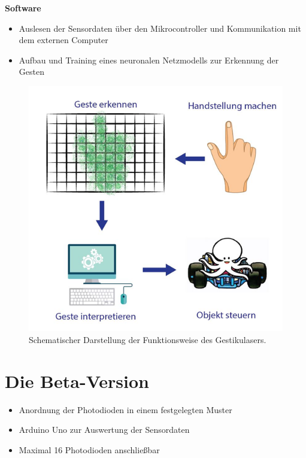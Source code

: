 \documentclass{sciposter}
\begin{document}
\begin{multicols}{3}
\noindent
\textbf{Software}
\begin{itemize}
	\item Auslesen der Sensordaten über den Mikrocontroller und Kommunikation mit dem externen Computer
	\item Aufbau und Training eines neuronalen Netzmodells zur Erkennung der Gesten
\end{itemize}

\begin{figure}[h]
	\centering
	\includegraphics[scale=1.3]{../figures/AblaufGestikulaser.png}
	\caption{Schematischer Darstellung der Funktionsweise des Gestikulasers.}
	\label{fig:FunktionsweiseGestikulaser}
\end{figure}


\section{Die Beta-Version}

\begin{itemize}
	\item Anordnung der Photodioden in einem festgelegten Muster
	\item Arduino Uno zur Auswertung der Sensordaten
	\item Maximal 16 Photodioden anschließbar
\end{itemize}


\end{multicols}
\end{document}

